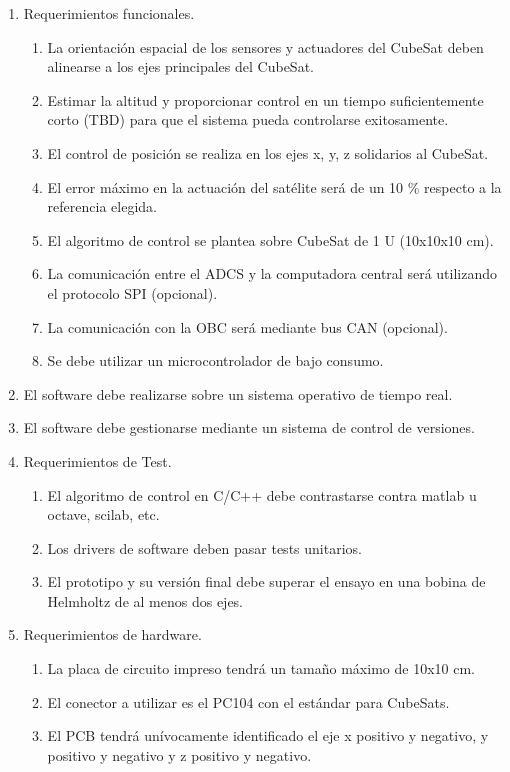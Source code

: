 \documentclass[
11pt, %
]{charter}
\begin{document}
\begin{enumerate}
	\item Requerimientos funcionales.
		\begin{enumerate}
			\item La orientación espacial de los sensores y actuadores del CubeSat deben alinearse a los ejes principales del CubeSat.
			\item  Estimar la altitud y proporcionar control en un tiempo suficientemente corto (TBD) para que el sistema pueda controlarse exitosamente. 
			\item El control de posición se realiza en los ejes x, y, z solidarios al CubeSat.  
			\item El error máximo en la actuación del satélite será de un 10 \% respecto a la referencia elegida. 
			\item El algoritmo de control se plantea sobre CubeSat de 1 U (10x10x10 cm).
			\item La comunicación entre el ADCS y la computadora central será utilizando el protocolo SPI (opcional).  %
			\item La comunicación con la OBC será mediante bus CAN (opcional).  
			\item Se debe utilizar un microcontrolador de bajo consumo. 
		\end{enumerate}
	\item El software debe realizarse sobre un sistema operativo de tiempo real.   
	\item El software debe gestionarse mediante un sistema de control de versiones. 
	\item Requerimientos de Test.
		\begin{enumerate}
			\item  El algoritmo de control en C/C++ debe contrastarse contra matlab u octave, scilab, etc. 
			\item  Los drivers de software deben pasar tests unitarios. 
			\item  El prototipo y su versión final debe superar el ensayo en una bobina de Helmholtz de al menos dos ejes.  
		\end{enumerate}
\item Requerimientos de hardware.
	\begin{enumerate}
		\item La placa de circuito impreso tendrá un tamaño máximo de 10x10 cm.
		\item El conector a utilizar es el PC104 con el estándar para CubeSats. 
		\item El PCB tendrá unívocamente identificado el eje x positivo y negativo, y positivo y negativo y z positivo y negativo. 
	\end{enumerate}


\end{enumerate}
\end{document}
